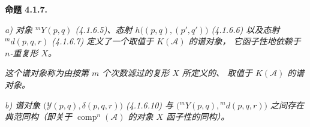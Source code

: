 \medskip\noindent\textbf{命题 4.1.7.}\quad

\noindent\textit{a) 对象 ${}^{m}\!Y(p,q)$ (4.1.6.5)、态射
$h\bigl((p,q),(p',q')\bigr)$ (4.1.6.6) 以及态射
${}^{m}\!d(p,q,r)$ (4.1.6.7) 定义了一个取值于 $K(\mathcal A)$ 的谱对象，
它函子性地依赖于 $n$-重复形 $X$。}

\noindent\textit{这个谱对象称为由按第 $m$ 个次数滤过的复形 $X$ 所定义的、
取值于 $K(\mathcal A)$ 的谱对象。}

\noindent\textit{b) 谱对象
$\bigl(\mathcal Y(p,q),\delta(p,q,r)\bigr)$ (4.1.6.10) 与
$\bigl({}^{m}\!Y(p,q),{}^{m}\!d(p,q,r)\bigr)$ 之间存在典范同构（即关于
$\operatorname{comp}^n(\mathcal A)$ 的对象 $X$ 函子性的同构）。}
\endgroup
